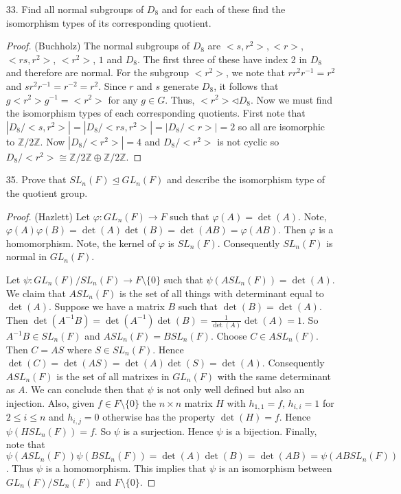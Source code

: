 \documentclass[10pt]{article}
\theoremstyle{plain}
\newcommand{\Z}{\mathbb{Z}}
\renewcommand{\phi}{\varphi}
\newcommand\inv{^{-1}}
\begin{document}
\begin{itemize}
\begin{proof}
\end{proof}

Suppose that $K\leq G$ and $N\unlhd K$. Using arguments similar to those above, we can show that $K\leq N_{G}(N)$.  Thus, any arbitrary normal 
subgoup of $G$ is contained in $N_{G}(N)$ and $N_{G}(N)$ is the largest subgroup of $G$ in which $N$ is normal.

\item[33.]  Find all normal subgroups of $D_8$ and for each of these find the isomorphism types of its corresponding quotient.

\begin{proof}(Buchholz)
The normal subgroups of $D_8$ are $<s,r^2>, <r>$, $<rs,r^2>$, $<r^2>$,
$1$ and $D_8$.  The first three of these have index 2 in $D_8$ and therefore are normal.  For the subgroup $<r^2>$, we note that $rr^2r^{-1}=r^2$ and $sr^2r^{-1}=r^{-2}=r^2$.  Since $r$ and $s$ generate $D_8$, it follows that $g<r^2>g^{-1}=<r^2>$ for any $g\in G.$  Thus, $<r^2>\lhd D_8.$\newline
Now we must find the isomorphism types of each corresponding quotients.  First note that $|D_8/<s,r^2>|=|D_8/<rs,r^2>|=|D_8/<r>|=2$ so all are isomorphic to $\Z/2\Z$.  Now $|D_8/<r^2>|=4$ and $D_8/<r^2>$ is not cyclic so $D_8/<r^2>\cong \Z/2\Z \oplus \Z/2\Z .$


\end{proof}


\item[35.] Prove that $SL_n(F) \unlhd GL_n(F)$ and describe the isomorphism type of the quotient group.

\begin{proof} (Hazlett)
Let $\phi: GL_n(F) \to F$ such that $\phi(A) = \det(A)$.  Note, $\phi(A)\phi(B) = \det(A)\det(B) = \det(AB) = \phi(AB)$.  Then $\phi$ is a homomorphism.  Note, the kernel of $\phi$ is $SL_n(F)$.  Consequently $SL_n(F)$ is normal in $GL_n(F)$.

Let $\psi: GL_n(F)/SL_n(F) \to F \setminus \{0\}$ such that $\psi(ASL_n(F)) = \det(A)$.  We claim that $ASL_n(F)$ is the set of all things with determinant equal to $\det(A)$.  Suppose we have a matrix $B$ such that $\det(B) = \det(A)$.  Then $\det(A\inv B) = \det(A\inv)\det(B) = \frac{1}{\det(A)}\det(A) =1$.  So $A\inv B \in SL_n(F)$ and $ASL_n(F) = BSL_n(F)$.  Choose $C \in ASL_n(F)$.  Then $C = AS$ where $S\in SL_n(F)$.  Hence $\det(C) = \det(AS) = \det(A)\det(S) = \det(A)$.  Consequently $ASL_n(F)$ is the set of all matrixes in $GL_n(F)$ with the same determinant as $A$.  We can conclude then that $\psi$ is not only well defined but also an injection.  Also, given $f \in F \setminus \{0\}$  the $n \times n$ matrix $H$ with $h_{1,1} = f$, $h_{i,i} = 1$ for $2\leq i \leq n$ and $h_{i,j} = 0$ otherwise has the property $\det(H) = f$.  Hence $\psi(HSL_n(F)) = f$.  So $\psi$ is a surjection.  Hence $\psi$ is a bijection.  Finally, note that $\psi(ASL_n(F))\psi(BSL_n(F)) = \det(A)\det(B) = \det(AB) = \psi(ABSL_n(F))$.  Thus $\psi$ is a homomorphism.  This implies that $\psi$ is an isomorphism between $GL_n(F)/SL_n(F)$ and $F \setminus \{0\}$.
\end{proof}


\end{itemize}
\end{document}
